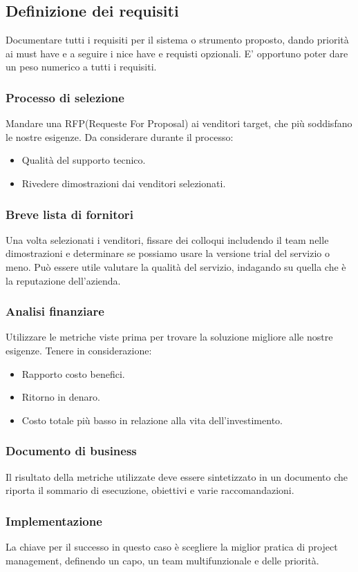 \documentclass{article}
\begin{document}
		\subsection{Definizione dei requisiti}
		Documentare tutti i requisiti per il sistema o strumento proposto, dando priorità ai must have e a seguire i nice have e requisti opzionali. 
		E' opportuno poter dare un peso numerico a tutti i requisiti.
		\subsubsection{Processo di selezione}
		Mandare una RFP(Requeste For Proposal) ai venditori target, che più soddisfano le nostre esigenze. Da considerare durante il processo:
		\begin{itemize}
		    \item Qualità del supporto tecnico.
		    \item Rivedere dimostrazioni dai venditori selezionati.
		\end{itemize}
		\subsubsection{Breve lista di fornitori}
		Una volta selezionati i venditori, fissare dei colloqui includendo il team nelle dimostrazioni e determinare se possiamo usare la versione trial del servizio o meno.
		Può essere utile valutare la qualità del servizio, indagando su quella che è la reputazione dell'azienda. 
		\subsubsection{Analisi finanziare}
		Utilizzare le metriche viste prima per trovare la soluzione migliore alle nostre esigenze. Tenere in considerazione:
		\begin{itemize}
		    \item Rapporto costo benefici.
		    \item Ritorno in denaro.
		    \item Costo totale più basso in relazione alla vita dell'investimento.
		\end{itemize}
		\subsubsection{Documento di business}
		Il risultato della metriche utilizzate deve essere sintetizzato in un documento che riporta il sommario di esecuzione, obiettivi e varie raccomandazioni.
		\subsubsection{Implementazione}
		La chiave per il successo in questo caso è scegliere la miglior pratica di project management, definendo un capo, un team multifunzionale e delle priorità.
\end{document}
